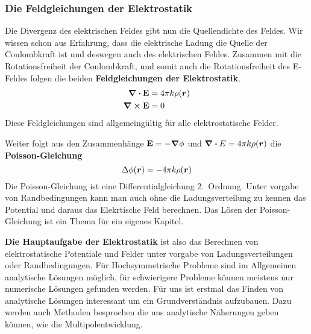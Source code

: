 \subsubsection{Die Feldgleichungen der Elektrostatik}%
\label{ssub:Die-Feldgleichungen}
Die Divergenz des elektrischen Feldes gibt nun die Quellendichte des Feldes.
Wir wissen schon aus Erfahrung, dass die elektrische Ladung die Quelle der 
Coulombkraft ist und deswegen auch des elektrischen Feldes. Zusammen mit die
Rotationsfreiheit der Coulombkraft, und somit auch die Rotationsfreiheit des
E-Feldes folgen die beiden \textbf{Feldgleichungen der Elektrostatik}.
\begin{equation}
  \begin{aligned}
    \div \vb E &= 4\pi k \rho(\vb*r)\\
    \curl \vb E &= 0
  \end{aligned}
\end{equation}
Diese Feldgleichungen sind allgemeingültig für alle elektrostatische Felder.

Weiter folgt aus den Zusammenhänge $\vb E = -\grad \phi$ und 
$\div E = 4\pi k \rho(\vb*r)$ die \textbf{Poisson-Gleichung} 
\begin{equation}
  \Delta \phi(\vb*r) = - 4\pi k \rho(\vb*r)
\end{equation}
Die Poisson-Gleichung ist eine Differentialgleichung 2.\ Ordnung. Unter 
vorgabe von Randbedingungen kann man auch ohne die Ladungsverteilung zu 
kennen das Potential und daraus das Elekrtische Feld berechnen. Das Lösen
der Poisson-Gleichung ist ein Thema für ein eigenes Kapitel. 

\textbf{Die Hauptaufgabe der Elektrostatik} ist also das Berechnen von 
elektrostatische Potentiale und Felder unter vorgabe von 
Ladungsverteilungen oder Randbedingungen. 
Für Hochsymmetrische Probleme sind im Allgemeinen analytische 
Lösungen möglich, für schwierigere Probleme können meistens nur numerische 
Lösungen gefunden werden. Für uns ist erstmal das Finden von analytische
Lösungen interessant um ein Grundverständnis aufzubauen. Dazu werden auch
Methoden besprochen die uns analytische Näherungen geben können, wie die
Multipolentwicklung.
